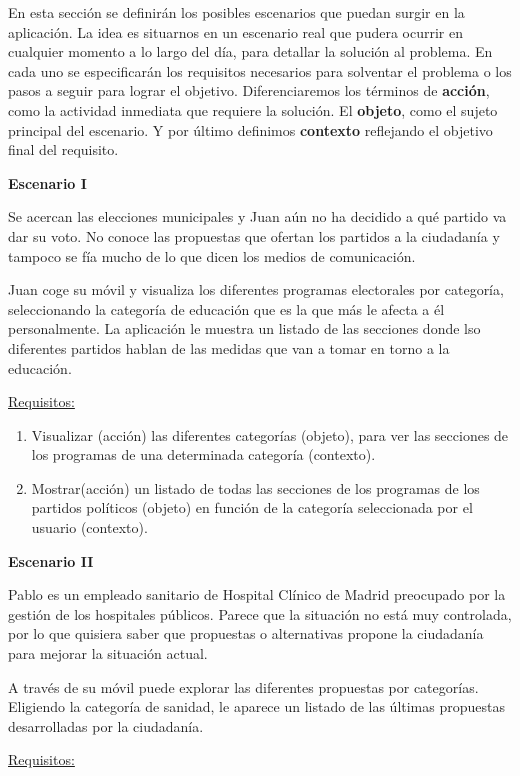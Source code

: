 En esta sección se definirán los posibles escenarios que puedan surgir en la aplicación. La idea es situarnos en un escenario real que pudera ocurrir en cualquier momento a lo largo del día, para detallar la solución al problema. En cada uno se especificarán los requisitos necesarios para solventar el problema o los pasos a seguir para lograr el objetivo. Diferenciaremos los términos de \textbf{acción}, como la actividad inmediata que requiere la solución. El \textbf{objeto}, como el sujeto principal del escenario. Y por último definimos \textbf{contexto} reflejando el objetivo final del requisito.

\textbf{Escenario I}

Se acercan las elecciones municipales y Juan aún no ha decidido a qué partido va dar su voto. No conoce las propuestas que ofertan los partidos a la ciudadanía y tampoco se fía mucho de lo que dicen los medios de comunicación.

Juan coge su móvil y visualiza los diferentes programas electorales por categoría, seleccionando la categoría de educación que es la que más le afecta a él personalmente. La aplicación le muestra un listado de las secciones donde lso diferentes partidos hablan de las medidas que van a tomar en torno a la educación.

\underline{Requisitos:}

\begin{enumerate}
\item Visualizar (acción) las diferentes categorías (objeto), para ver las secciones de los programas de una determinada categoría (contexto).
\item Mostrar(acción) un listado de todas las secciones de los programas de los partidos  políticos (objeto) en función de la categoría seleccionada por el usuario (contexto).
\end{enumerate}

\textbf{Escenario II}

Pablo es un empleado sanitario de Hospital Clínico de Madrid preocupado por la gestión de los hospitales públicos. Parece que la situación no está muy controlada, por lo que quisiera saber que propuestas o alternativas propone la ciudadanía para mejorar la situación actual.

A través de su móvil puede explorar las diferentes propuestas por categorías. Eligiendo la categoría de sanidad, le aparece un listado de las últimas propuestas desarrolladas por la ciudadanía.

\underline{Requisitos:}

